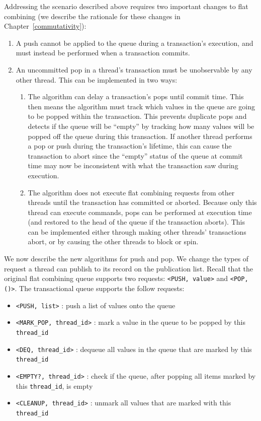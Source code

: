 Addressing the scenario described above requires two important changes to flat combining (we describe the rationale for these changes in Chapter~\ref{commutativity}): 
\begin{enumerate}
\item A push cannot be applied to the queue during a transaction's execution, and must instead be performed when a transaction commits.
\item An uncommitted pop in a thread's transaction must be unobservable by any other thread. This can be implemented in two ways:  
    \begin{enumerate}
        \item The algorithm can delay a transaction's pops until commit time. This then means the algorithm must track which values in the queue are going to be popped within the transaction. This prevents duplicate pops and detects if the queue will be ``empty'' by tracking how many values will be popped off the queue during this transaction. If another thread performs a pop or push during the transaction's lifetime, this can cause the transaction to abort since the ``empty'' status of the queue at commit time may now be inconsistent with what the transaction saw during execution. 
        \item The algorithm does not execute flat combining requests from other threads until the transaction has committed or aborted. Because only this thread can execute commands, pops can be performed at execution time (and restored to the head of the queue if the transaction aborts). This can be implemented either through making other threads' transactions abort, or by causing the other threads to block or spin.
    \end{enumerate}
\end{enumerate}

We now describe the new algorithms for push and pop.  We change the types of request a thread can publish to its record on the publication list. Recall that the original flat combining queue supports two requests: \texttt{<PUSH, value>} and \texttt{<POP, ()>}. The transactional queue supports the follow requests:
\begin{itemize}
    \item \texttt{<PUSH, list>} : push a list of values onto the queue
    \item \texttt{<MARK\_POP, thread\_id>} : mark a value in the queue to be popped by this \texttt{thread\_id}
    \item \texttt{<DEQ, thread\_id>} : dequeue all values in the queue that are marked by this \texttt{thread\_id}
    \item \texttt{<EMPTY?, thread\_id>} : check if the queue, after popping all items marked by this \texttt{thread\_id}, is empty
    \item \texttt{<CLEANUP, thread\_id>} : unmark all values that are marked with this \texttt{thread\_id}
\end{itemize}

